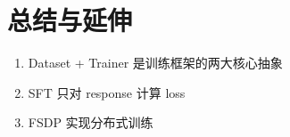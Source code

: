 \section{总结与延伸}
\begin{enumerate}
  \item Dataset + Trainer 是训练框架的两大核心抽象
  \item SFT 只对 response 计算 loss
  \item FSDP 实现分布式训练
\end{enumerate}


